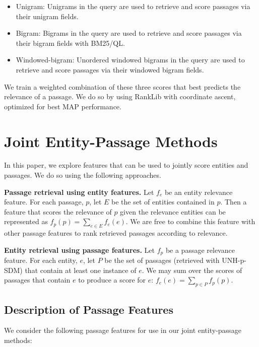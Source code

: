 \documentclass{article}
\begin{document}
 \begin{itemize}
     \item Unigram: Unigrams in the query are used to retrieve and score passages via their unigram fields.
     \item Bigram: Bigrams in the query are used to retrieve and score passages via their bigram fields with BM25/QL.
     \item Windowed-bigram: Unordered windowed bigrams in the query are used to retrieve and score passages via their windowed bigram fields. 
 \end{itemize}
 

We train a weighted combination of these three scores that best predicts the relevance of a passage.  We do so by using RankLib with coordinate ascent, optimized for best MAP performance. 


\section{Joint Entity-Passage Methods}\label{sec:joint}


In this paper, we explore features that can be used to jointly score entities and passages. We do so using the following approaches.

\textbf{Passage retrieval using entity features.} Let $f_e$ be an entity relevance feature.
For each passage, $p$, let $E$ be the set of entities contained in $p$.
Then a feature that scores the relevance of $p$ given the relevance entities can be represented as $f_p(p) = \sum_{e \in E}{f_e(e)}$. 
We are free to combine this feature with other passage features to rank retrieved passages according to relevance.

\textbf{Entity retrieval using passage features.} Let $f_p$ be a passage relevance feature.
For each entity, $e$, let $P$ be the set of passages (retrieved with UNH-p-SDM) that contain at least one instance of $e$.
We may sum over the scores of passages that contain $e$ to produce a score for $e$: $f_e(e) = \sum_{p \in P}{f_p(p)}$.

\subsection{Description of Passage Features}\label{sec:jointpassage}
We consider the following passage features for use in our joint entity-passage methods:
\end{document}
